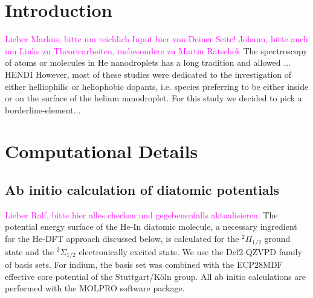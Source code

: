 \documentclass[twoside,twocolumn,9pt]{article}
\def\hl#1{\textcolor{magenta}{#1}}  %
\begin{document}
\renewcommand*\rmdefault{bch}\normalfont\upshape
\rmfamily
\section*{}
\vspace{-1cm}





\section{Introduction}
\hl{Lieber Markus, bitte um reichlich Input hier von Deiner Seite! Johann, bitte auch um Links zu Theoriearbeiten, insbesondere zu Martin Ratschek}
The spectroscopy of atoms or molecules in He nanodroplets has a long tradition and allowed ... 
HENDI
However, most of these studies were dedicated to the investigation of either helliophilic or heliophobic dopants, i.e. species preferring to be either inside or on the surface of the helium nanodroplet. 
For this study we decided to pick a borderline-element...


\section{Computational Details}

\subsection{Ab initio calculation of diatomic potentials}
\hl{Lieber Ralf, bitte hier alles checken und gegebenenfalls aktualisieren.}
The potential energy surface of the He-In diatomic molecule, a necessary ingredient for the He-DFT approach discussed below, is calculated for  the $^2\Pi{}_{1/2}$ ground state and the $^2\Sigma{}_{1/2}$ electronically excited state. We use the Def2-QZVPD family of basis sets. \cite{Rappoport2010} For indium, the basis set was combined with the ECP28MDF effective core potential of the Stuttgart/K\"oln group.\cite{Metz2000}  All ab initio calculations are performed with the MOLPRO software package.\cite{MOLPRO}
\end{document}
